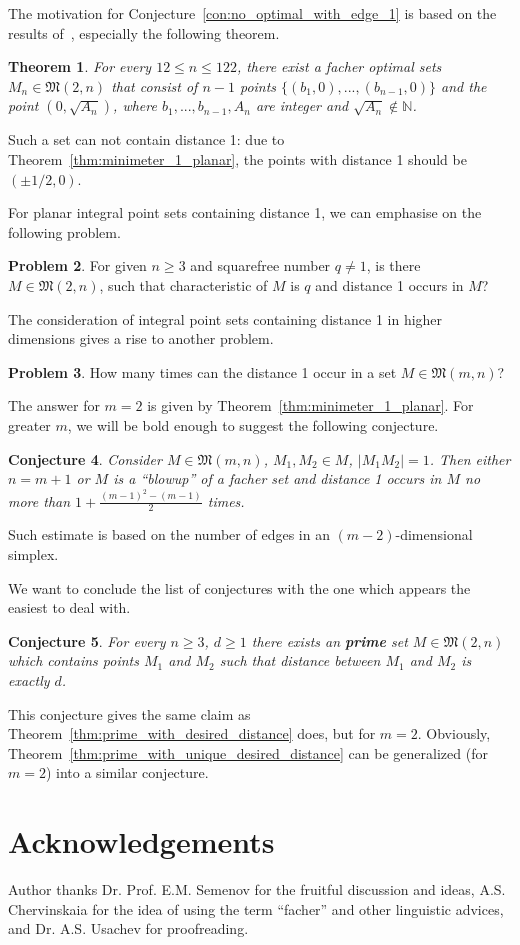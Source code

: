 \documentclass[a4paper,14pt]{article} %
\theoremstyle{plain}
\newtheorem{theorem}{Theorem}[section]
\newtheorem{conjecture}[theorem]{Conjecture}
\theoremstyle{definition}
\newtheorem{problem}[theorem]{Problem}
\begin{document}
The motivation for Conjecture~\ref{con:no_optimal_with_edge_1} is based on the results of~\cite[Section 5]{kurz2008minimum},
especially the following theorem.

\begin{theorem}
	For every $12 \leq n \leq 122$, there exist a facher optimal sets $M_n\in\mathfrak{M}(2,n)$
	that consist of $n-1$ points $\{ (b_1,0), ..., (b_{n-1},0)\}$
	and the point $(0,\sqrt{A_n})$,
	where $b_1,...,b_{n-1}, A_n$ are integer and $\sqrt{A_n}\notin\mathbb{N}$.
\end{theorem}
Such a set can not contain distance 1: due to Theorem~\ref{thm:minimeter_1_planar},
the points with distance 1 should be $(\pm 1/2, 0)$.

For planar integral point sets containing distance 1, we can emphasise on the following problem.
\begin{problem}
	For given $n\geq 3$ and squarefree number $q \neq 1$,
	is there $M\in\mathfrak{M}(2,n)$, such that characteristic of $M$ is $q$
	and distance 1 occurs in $M$?
\end{problem}

The consideration of integral point sets containing distance 1 in higher dimensions gives a rise to another problem.

\begin{problem}
	How many times can the distance 1 occur in a set $M\in\mathfrak{M}(m,n)$?
\end{problem}
The answer for $m=2$ is given by Theorem~\ref{thm:minimeter_1_planar}.
For greater $m$, we will be bold enough to suggest the following conjecture.
\begin{conjecture}
	Consider $M\in\mathfrak{M}(m,n)$, $M_1,M_2\in M$, $|M_1 M_2| =1$.
	Then either $n = m+1$ or $M$ is a ``blowup'' of a facher set and distance 1 occurs in $M$
	no more than $1+\frac{(m-1)^2 - (m-1)}{2}$ times.
\end{conjecture}
Such estimate is based on the number of edges in an $(m-2)$-dimensional simplex.

We want to conclude the list of conjectures with the one which appears the easiest to deal with.


\begin{conjecture}
	\label{hyp:prime_planar}
	For every $n \geq 3$, $d \geq 1$ there exists an \textbf{prime}
	set $M\in\mathfrak{M}(2,n)$ which
	contains points $M_1$ and $M_2$ such that distance between $M_1$ and $M_2$ is exactly $d$.
\end{conjecture}
This conjecture gives the same claim as Theorem~\ref{thm:prime_with_desired_distance} does, but for $m=2$.
Obviously, Theorem~\ref{thm:prime_with_unique_desired_distance} can be generalized (for $m=2$) into a similar conjecture.


\section{Acknowledgements}
Author thanks Dr. Prof. E.M. Semenov for the fruitful discussion and ideas,
A.S. Chervinskaia for the idea of using the term ``facher'' and other linguistic advices,
and Dr. A.S. Usachev for proofreading.


\printbibliography
\end{document}
